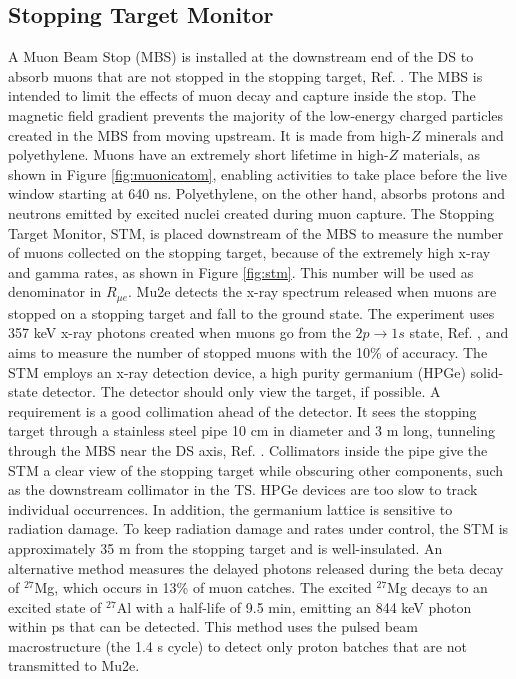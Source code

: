 \subsection{Stopping Target Monitor}
A Muon Beam Stop (MBS) is installed at the downstream end of the DS to absorb muons that are not stopped in the stopping target, Ref. \cite{bartoszek2015mu2e}. The MBS is intended to limit the effects of muon decay and capture inside the stop. The magnetic field gradient prevents the majority of the low-energy charged particles created in the MBS from moving upstream. It is made from high-$Z$ minerals and polyethylene. Muons have an extremely short lifetime in high-$Z$ materials, as shown in Figure \ref{fig:muonicatom}, enabling activities to take place before the live window starting at 640 ns. Polyethylene, on the other hand, absorbs protons and neutrons emitted by excited nuclei created during muon capture.
The Stopping Target Monitor, STM, is placed downstream of the MBS to measure the number of muons collected on the stopping target, because of the extremely high x-ray and gamma rates, as shown in Figure \ref{fig:stm}. This number will be used as denominator in $R_{\mu e}$. Mu2e detects the x-ray spectrum released when muons are stopped on a stopping target and fall to the ground state. The experiment uses 357 keV x-ray photons created when muons go from the $2p \rightarrow 1s$ state, Ref. \cite{bobbb}, and aims to measure the number of stopped muons with the 10\% of accuracy. The STM employs an x-ray detection device, a high purity germanium (HPGe) solid-state detector. The detector should only view the target, if possible. A requirement is a good collimation ahead of the detector. It sees the stopping target through a stainless steel pipe 10 cm in diameter and 3 m long, tunneling through the MBS near the DS axis, Ref. \cite{stm}. Collimators inside the pipe give the STM a clear view of the stopping target while obscuring other components, such as the downstream collimator in the TS. HPGe devices are too slow to track individual occurrences. In addition, the germanium lattice is sensitive to radiation damage. To keep radiation damage and rates under control, the STM is approximately 35 m from the stopping target and is well-insulated. An alternative method measures the delayed photons released during the beta decay of $^{27}$Mg, which occurs in 13\% of muon catches. The excited $^{27}$Mg decays to an excited state of $^{27}$Al with a half-life of 9.5 min, emitting an 844 keV photon within ps that can be detected. This method uses the pulsed beam macrostructure (the 1.4 s cycle) to detect only proton batches that are not transmitted to Mu2e.
